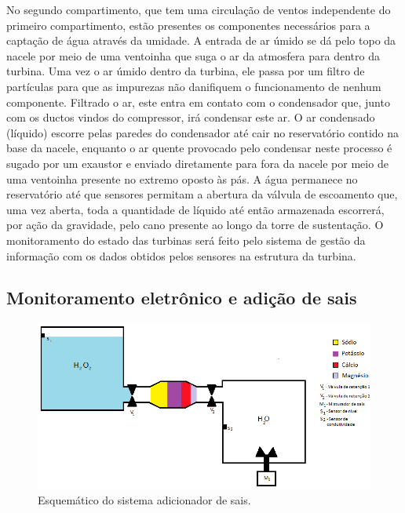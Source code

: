   No segundo compartimento, que tem uma circulação de ventos independente do primeiro compartimento, estão presentes os componentes necessários para a captação de água através da umidade. A entrada de ar úmido se dá pelo topo da nacele por meio de uma ventoinha que suga o ar da atmosfera para dentro da turbina. Uma vez o ar úmido dentro da turbina, ele passa por um filtro de partículas para que as impurezas não danifiquem o funcionamento de nenhum componente. Filtrado o ar, este entra em contato com o condensador que, junto com os ductos vindos do compressor, irá condensar este ar. O ar condensado (líquido) escorre pelas paredes do condensador até cair no reservatório contido na base da nacele, enquanto o ar quente provocado pelo condensar neste processo é sugado por um exaustor e enviado diretamente para fora da nacele por meio de uma ventoinha presente no extremo oposto às pás. A água permanece no reservatório até que sensores permitam a abertura da válvula de escoamento que, uma vez aberta, toda a quantidade de líquido até então armazenada escorrerá, por ação da gravidade, pelo cano presente ao longo da torre de sustentação.
  O monitoramento do estado das turbinas será feito pelo sistema de gestão da informação com os dados obtidos pelos sensores na estrutura 
  da turbina.

\subsection{Monitoramento eletrônico e adição de sais}

  \begin{figure}[!htbp]
    \centering
    \includegraphics[scale=0.6]{editaveis/figuras/sistema_adicionador_sais}
    \caption[Esquemático do sistema adicionador de sais]{Esquemático do sistema adicionador de sais.}
    \label{sistema_adicionador_sais_1}
  \end{figure}
  \FloatBarrier
    

